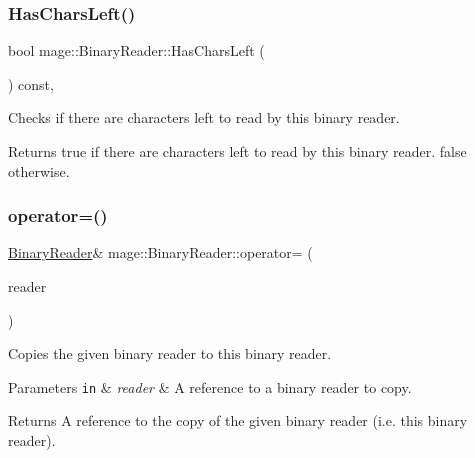 \subsubsection{\texorpdfstring{Has\+Chars\+Left()}{HasCharsLeft()}}
{\footnotesize\ttfamily bool mage\+::\+Binary\+Reader\+::\+Has\+Chars\+Left (\begin{DoxyParamCaption}{ }\end{DoxyParamCaption}) const\hspace{0.3cm}{\ttfamily [protected]}, {\ttfamily [noexcept]}}

Checks if there are characters left to read by this binary reader.

\begin{DoxyReturn}{Returns}
{\ttfamily true} if there are characters left to read by this binary reader. {\ttfamily false} otherwise. 
\end{DoxyReturn}
\hypertarget{classmage_1_1_binary_reader_a0408bb456983b4a03ae42ab69c6f4bc3}{}\label{classmage_1_1_binary_reader_a0408bb456983b4a03ae42ab69c6f4bc3} 
\subsubsection{\texorpdfstring{operator=()}{operator=()}\hspace{0.1cm}{\footnotesize\ttfamily [1/2]}}
{\footnotesize\ttfamily \hyperlink{classmage_1_1_binary_reader}{Binary\+Reader}\& mage\+::\+Binary\+Reader\+::operator= (\begin{DoxyParamCaption}\item[{const \hyperlink{classmage_1_1_binary_reader}{Binary\+Reader} \&}]{reader }\end{DoxyParamCaption})\hspace{0.3cm}{\ttfamily [delete]}}

Copies the given binary reader to this binary reader.


\begin{DoxyParams}[1]{Parameters}
\mbox{\tt in}  & {\em reader} & A reference to a binary reader to copy. \\
\hline
\end{DoxyParams}
\begin{DoxyReturn}{Returns}
A reference to the copy of the given binary reader (i.\+e. this binary reader). 
\end{DoxyReturn}
\hypertarget{classmage_1_1_binary_reader_a280998bb89dacdcb88ec87c49ce90a02}{}\label{classmage_1_1_binary_reader_a280998bb89dacdcb88ec87c49ce90a02} 
